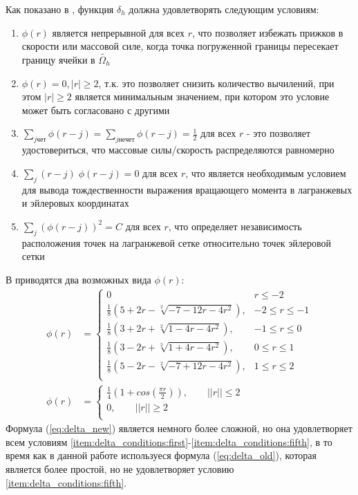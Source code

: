 Как показано в \cite{peskin2002immersed}, функция $\delta_h$ должна удовлетворять следующим условиям:
\begin{enumerate}
    \item \label{item:delta_conditions:first} $\phi(r)$ является непрерывной для всех $r$, что позволяет избежать прижков в скорости или массовой силе,
        когда точка погруженной границы пересекает границу ячейки в $\tilde{\Omega_h}$
    \item \label{item:delta_conditions:second} $\phi(r) = 0, |r| \geq 2$, т.к. это позволяет снизить количество вычилений, при этом $|r| \geq 2$
        является минимальным значением, при котором это условие может быть согласовано с другими
    \item \label{item:delta_conditions:third} $\sum_{j чет} \phi(r - j) = \sum_{j нечет} \phi(r - j) = \frac{1}{2}$ для всех $r$ - это позволяет
        удостовериться, что массовые силы/скорость распределяются равномерно
    \item \label{item:delta_conditions:fourth} $\sum_{j} (r - j)\; \phi(r - j) = 0$ для всех $r$, что является необходимым условием для вывода тождественности
        выражения вращающего момента в лагранжевых и эйлеровых координатах
    \item \label{item:delta_conditions:fifth} $\sum_{j} (\phi(r - j))^2 = C$ для всех $r$, что определяет независимость расположения точек на лагранжевой сетке
        относительно точек эйлеровой сетки
\end{enumerate}
В \cite{peskin2002immersed} приводятся два возможных вида $\phi(r)$:
\begin{align}
    \label{eq:delta_new}
    \phi(r) &= 
        \begin{cases}
            0 & r \leq -2\\
            \frac{1}{8} \left( 5 + 2r - \sqrt[2]{-7 - 12r -4r^2} \right), & -2 \leq r \leq -1\\
            \frac{1}{8} \left( 3 + 2r + \sqrt[2]{1 - 4r -4r^2} \right), & -1 \leq r \leq 0\\
            \frac{1}{8} \left( 3 - 2r + \sqrt[2]{1 + 4r -4r^2} \right), & 0 \leq r \leq 1\\
            \frac{1}{8} \left( 5 - 2r - \sqrt[2]{-7 + 12r -4r^2} \right), & 1 \leq r \leq 2\\
        \end{cases}
    \\
    \label{eq:delta_old}
    \phi(r) &= 
        \begin{cases}
            \frac{1}{4} \left( 1 + cos\left( \frac{\pi r}{2} \right) \right),\qquad ||r|| \leq 2\\
            0 ,\qquad ||r|| \geq 2\\
        \end{cases}
\end{align}
Формула (\ref{eq:delta_new}) является немного более сложной, но она удовлетворяет всем условиям 
\ref{item:delta_conditions:first}-\ref{item:delta_conditions:fifth}, в то время как в данной работе
используеся формула (\ref{eq:delta_old}), которая является более простой, но не удовлетворяет условию \ref{item:delta_conditions:fifth}.

